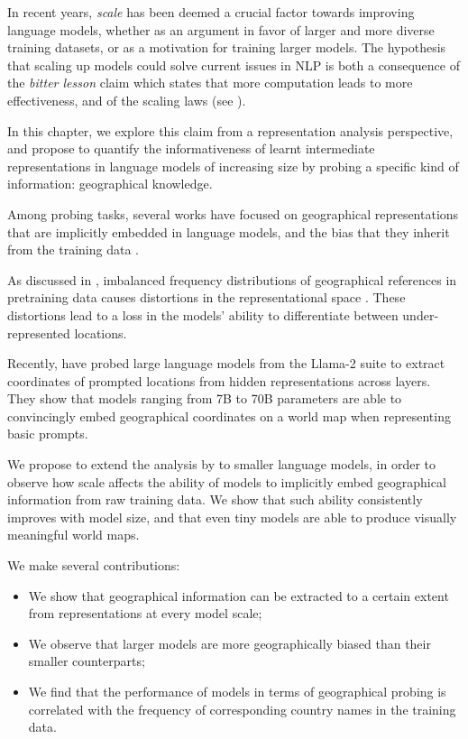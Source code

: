 In recent years, \textit{scale} has been deemed a crucial factor towards improving language models, whether as an argument in favor of larger and more diverse training datasets, or as a motivation for training larger models. The hypothesis that scaling up models could solve current issues in NLP is both a consequence of the \textit{bitter lesson} claim \citep{Sutton_2019} which states that more computation leads to more effectiveness, and of the scaling laws (see ).

In this chapter, we explore this claim from a representation analysis perspective, and propose to quantify the informativeness of learnt intermediate representations in language models of increasing size by probing a specific kind of information: geographical knowledge. 

Among probing tasks, several works have focused on geographical representations that are implicitly embedded in language models, and the bias that they inherit from the training data \citep{lotr, faisal-anastasopoulos-2022-geographic, faisal-etal-2022-dataset}.

As discussed in , imbalanced frequency distributions of geographical references in pretraining data causes distortions in the representational space \citep{zhou2021freqbased}. These distortions lead to a loss in the models' ability to differentiate between under-represented locations.

Recently, \citet{gurnee2023language} have probed large language models from the Llama-2 suite \citep{touvron2023llama} to extract coordinates of prompted locations from hidden representations across layers. They show that models ranging from 7B to 70B parameters are able to convincingly embed geographical coordinates on a world map when representing basic prompts.

We propose to extend the analysis by \citet{gurnee2023language} to smaller language models, in order to observe how scale affects the ability of models to implicitly embed geographical information from raw training data. We show that such ability consistently improves with model size, and that even tiny models are able to produce visually meaningful world maps.

We make several contributions:
\begin{itemize}
    \item We show that geographical information can be extracted to a certain extent from representations at every model scale;
    \item We observe that larger models are more geographically biased than their smaller counterparts;
    \item We find that the performance of models in terms of geographical probing is correlated with the frequency of corresponding country names in the training data.
\end{itemize} 

